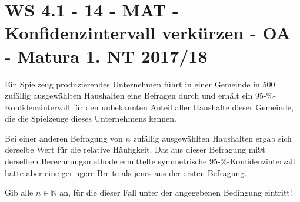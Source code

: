 \section{WS 4.1 - 14 - MAT - Konfidenzintervall verkürzen - OA - Matura 1. NT 2017/18}

\begin{beispiel}[WS 4.1]{1}
Ein Spielzeug produzierendes Unternehmen führt in einer Gemeinde in 500 zufällig ausgewählten Haushalten eine Befragen durch und erhält ein 95-\%-Konfidenzintervall für den unbekannten Anteil aller Haushalte dieser Gemeinde, die die Spielzeuge dieses Unternehmens kennen.

Bei einer anderen Befragung von $n$ zufällig ausgewählten Haushalten ergab sich derselbe Wert für die relative Häufigkeit. Das aus dieser Befragung mi9t derselben Berechnungsmethode ermittelte symmetrische 95-\%-Konfidenzintervall hatte aber eine geringere Breite als jenes aus der ersten Befragung.

Gib alle $n\in\mathbb{N}$ an, für die dieser Fall unter der angegebenen Bedingung eintritt!

\end{beispiel}